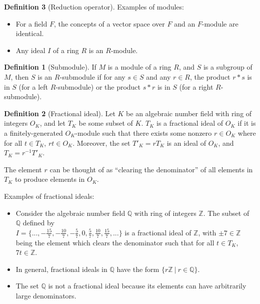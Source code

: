 \documentclass{article}
\theoremstyle{definition}
\newtheorem{definition}{Definition}[section]
\theoremstyle{theorem}
\theoremstyle{example}
\theoremstyle{corollary}
\begin{document}
\begin{definition}[Reduction operator]
\bigskip

Examples of modules:
\begin{itemize}
\item For a field \(F\), the concepts of a vector space over \(F\) and an \(F\)-module are identical.
\item Any ideal \(I\) of a ring \(R\) is an \(R\)-module.
\end{itemize}

\bigskip

\theoremstyle{definition}
\begin{definition}[Submodule]
If \(M\) is a module of a ring \(R\), and \(S\) is a subgroup of \(M\), then \(S\) is an \(R\)-submodule if for any \(s \in S\) and any \(r \in R\), the product \(r * s\) is in \(S\) (for a left \(R\)-submodule) or the product \(s * r\) is in \(S\) (for a right \(R\)-submodule).
\end{definition}

\bigskip

\theoremstyle{definition}
\begin{definition}[Fractional ideal]
Let \(K\) be an algebraic number field with ring of integers \(O_{K}\), and let \(T_{K}\) be some subset of \(K\). \(T_{K}\) is a fractional ideal of \(O_{K}\) if it is a finitely-generated \(O_{K}\)-module such that there exists some nonzero \(r \in O_{K}\) where for all \(t \in T_{K}\), \(r t \in O_{K}\). Moreover, the set \(T'_{K} = r T_{K}\) is an ideal of \(O_{K}\), and \(T_{K} = r^{-1} T'_{K}\).
\end{definition}

\bigskip

The element \(r\) can be thought of as ``clearing the denominator'' of all elements in \(T_{K}\) to produce elements in \(O_{K}\).

\bigskip

Examples of fractional ideals:
\begin{itemize}
\item Consider the algebraic number field \(\mathbb{Q}\) with ring of integers \(\mathbb{Z}\). The subset of \(\mathbb{Q}\) defined by \\ \(I = \{ . . . , -\frac{15}{7}, -\frac{10}{7}, -\frac{5}{7}, 0, \frac{5}{7}, \frac{10}{7}, \frac{15}{7}, . . . \}\) is a fractional ideal of \(\mathbb{Z}\), with \(\pm 7 \in \mathbb{Z}\) being the element which clears the denominator such that for all \(t \in T_{K}\), \(7t \in \mathbb{Z}\).
\item In general, fractional ideals in \(\mathbb{Q}\) have the form \(\{ r \mathbb{Z} \ | \ r \in \mathbb{Q} \}\).
\item The set \(\mathbb{Q}\) is not a fractional ideal because its elements can have arbitrarily large denominators.
\end{itemize}


\end{definition}
\end{document}
